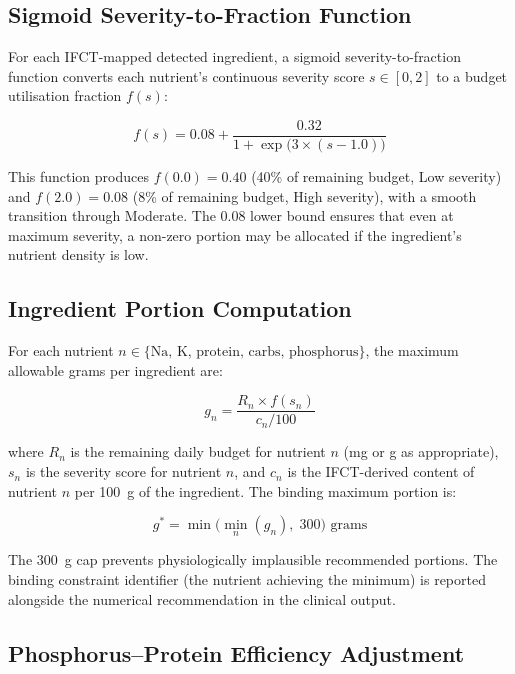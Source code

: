 \documentclass[journal]{IEEEtran}
\begin{document}
\subsection{Sigmoid Severity-to-Fraction Function}

For each IFCT-mapped detected ingredient, a sigmoid severity-to-fraction
function converts each nutrient's continuous severity score $s \in [0,2]$
to a budget utilisation fraction $f(s)$:

\begin{equation}
f(s) = 0.08 + \frac{0.32}{1 + \exp\!\bigl(3 \times (s - 1.0)\bigr)}
\label{eq:sigmoid}
\end{equation}

This function produces $f(0.0) = 0.40$ (40\% of remaining budget, Low
severity) and $f(2.0) = 0.08$ (8\% of remaining budget, High severity),
with a smooth transition through Moderate. The 0.08 lower bound ensures
that even at maximum severity, a non-zero portion may be allocated if
the ingredient's nutrient density is low.

\subsection{Ingredient Portion Computation}

For each nutrient $n \in \{\text{Na, K, protein, carbs, phosphorus}\}$,
the maximum allowable grams per ingredient are:

\begin{equation}
g_n = \frac{R_n \times f(s_n)}{c_n / 100}
\label{eq:grams}
\end{equation}

where $R_n$ is the remaining daily budget for nutrient $n$
(mg or g as appropriate), $s_n$ is the severity score for nutrient $n$,
and $c_n$ is the IFCT-derived content of nutrient $n$ per 100~g of the
ingredient. The binding maximum portion is:

\begin{equation}
g^* = \min\bigl(\min_n(g_n),\; 300\bigr) \text{ grams}
\label{eq:binding}
\end{equation}

The 300~g cap prevents physiologically implausible recommended portions.
The binding constraint identifier (the nutrient achieving the minimum)
is reported alongside the numerical recommendation in the clinical
output.

\subsection{Phosphorus--Protein Efficiency Adjustment}
\end{document}
